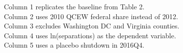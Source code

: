 \begin{table}[htbp]
   \par \raggedright 
   Column 1 replicates the baseline from Table 2.\\
   Column 2 uses 2010 QCEW federal share instead of 2012.\\
   Column 3 excludes Washington DC and Virginia counties.\\
   Column 4 uses ln(separations) as the dependent variable.\\
   Column 5 uses a placebo shutdown in 2016Q4.
\end{table}


